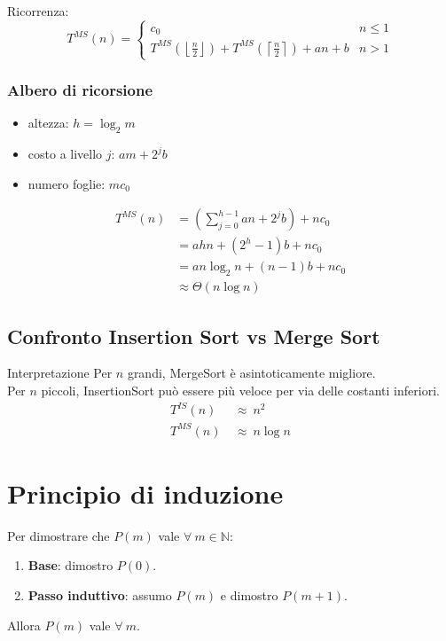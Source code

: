 \documentclass{article}
\begin{document}
Ricorrenza:
\[
T^{MS}(n)=
\begin{cases}
c_0 & n \le 1\\[4pt]
T^{MS}\!\left(\left\lfloor \frac{n}{2}\right\rfloor\right)
+T^{MS}\!\left(\left\lceil \frac{n}{2}\right\rceil\right)
+an+b & n>1
\end{cases}
\]

\subsubsection{Albero di ricorsione}
\begin{itemize}
    \item altezza: $h=\log_2 m$
    \item costo a livello $j$: $am+2^j b$
    \item numero foglie: $m c_0$
\end{itemize}

\begin{align*}
T^{MS}(n)
&= \left(\sum_{j=0}^{h-1}an+2^j b\right)+n c_0 \\
&=ahn+\left(2^h-1\right)b+nc_{0}\\
&= an\log_2 n+(n-1)b+n c_0 \\
&\approx \Theta(n\log n)
\end{align*}

\subsection{Confronto Insertion Sort vs Merge Sort}

\begin{tip}{Interpretazione}{}
Per $n$ grandi, MergeSort è asintoticamente migliore.\\
Per $n$ piccoli, InsertionSort può essere più veloce per via delle costanti inferiori.
\[
\begin{aligned}
T^{IS}(n)\ &\approx\ n^2 \\
T^{MS}(n)\ &\approx\ n\log n
\end{aligned}
\]
\end{tip}

\section{Principio di induzione}

Per dimostrare che $P(m)$ vale $\forall\ m\in\mathbb{N}$:
\begin{enumerate}
    \item \textbf{Base}: dimostro $P(0)$.
    \item \textbf{Passo induttivo}: assumo $P(m)$ e dimostro $P(m+1)$.
\end{enumerate}
Allora $P(m)$ vale $\forall\ m$.
\end{document}
